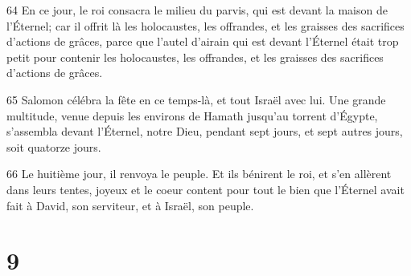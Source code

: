 \par 64 En ce jour, le roi consacra le milieu du parvis, qui est devant la maison de l'Éternel; car il offrit là les holocaustes, les offrandes, et les graisses des sacrifices d'actions de grâces, parce que l'autel d'airain qui est devant l'Éternel était trop petit pour contenir les holocaustes, les offrandes, et les graisses des sacrifices d'actions de grâces.
\par 65 Salomon célébra la fête en ce temps-là, et tout Israël avec lui. Une grande multitude, venue depuis les environs de Hamath jusqu'au torrent d'Égypte, s'assembla devant l'Éternel, notre Dieu, pendant sept jours, et sept autres jours, soit quatorze jours.
\par 66 Le huitième jour, il renvoya le peuple. Et ils bénirent le roi, et s'en allèrent dans leurs tentes, joyeux et le coeur content pour tout le bien que l'Éternel avait fait à David, son serviteur, et à Israël, son peuple.

\chapter{9}

